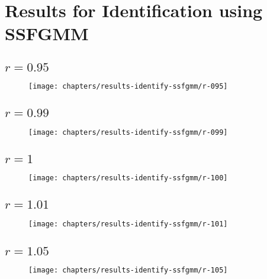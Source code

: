 \chapter{Results for Identification using SSFGMM}
\label{apx:results-identify-ssfgmm}

\section{$r = 0.95$}



\begin{figure}[ht]
    \centering
    \texttt{[image: chapters/results-identify-ssfgmm/r-095]}
    \label{fig:r-095}
\end{figure}

\newpage
\section{$r = 0.99$}



\begin{figure}[ht]
    \centering
    \texttt{[image: chapters/results-identify-ssfgmm/r-099]}
    \label{fig:r-099}
\end{figure}

\newpage
\section{$r = 1$}



\begin{figure}[ht]
    \centering
    \texttt{[image: chapters/results-identify-ssfgmm/r-100]}
    \label{fig:r-100}
\end{figure}

\newpage
\section{$r = 1.01$}



\begin{figure}[ht]
    \centering
    \texttt{[image: chapters/results-identify-ssfgmm/r-101]}
    \label{fig:r-101}
\end{figure}

\newpage
\section{$r = 1.05$}



\begin{figure}[ht]
    \centering
    \texttt{[image: chapters/results-identify-ssfgmm/r-105]}
    \label{fig:r-105}
\end{figure}